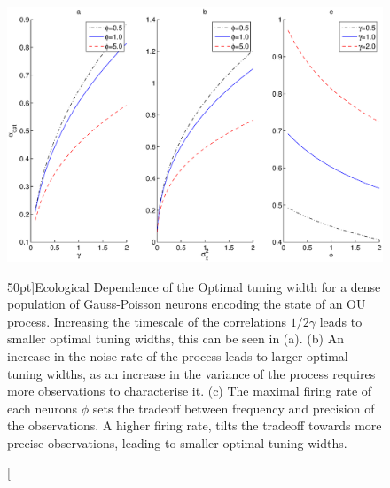 \begin{figure}
\label{fig:ecological_ou}
\includegraphics[width=\columnwidth]{figures/figure_5_4.eps}
\caption[Ecological dependence of the optimal encoder.][50pt]{Ecological Dependence of the Optimal tuning width for a dense population of Gauss-Poisson neurons encoding the state of an OU process. Increasing the timescale of the correlations $1/2\gamma$ leads to smaller optimal tuning widths, this can be seen in (a). (b) An increase in the noise rate of the process leads to larger optimal
tuning widths, as an increase in the variance of the process requires more observations to characterise it. (c) The maximal firing rate of each neurons $\phi$ sets the tradeoff
between frequency and precision of the observations. A higher firing rate, tilts the tradeoff towards more precise observations, leading to smaller optimal tuning widths. }
\end{figure}

